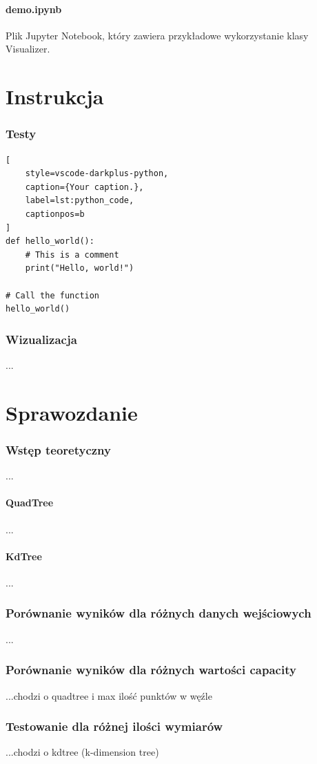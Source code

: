 \documentclass{lab}
\begin{document}
\subsection{demo.ipynb}
Plik Jupyter Notebook, który zawiera przykładowe wykorzystanie klasy Visualizer.

\part{Instrukcja}
\section{Testy}

\begin{lstlisting}[
    style=vscode-darkplus-python,
    caption={Your caption.},
    label=lst:python_code,
    captionpos=b
]
def hello_world():
    # This is a comment
    print("Hello, world!")

# Call the function
hello_world()
\end{lstlisting}

\section{Wizualizacja}
...

\part{Sprawozdanie}
\section{Wstęp teoretyczny}
...
\subsection{QuadTree}
...
\subsection{KdTree}
...
\section{Porównanie wyników dla różnych danych wejściowych}
...
\section{Porównanie wyników dla różnych wartości capacity}
...chodzi o quadtree i max ilość punktów w węźle
\section{Testowanie dla różnej ilości wymiarów}
...chodzi o kdtree (k-dimension tree)
\end{document}
